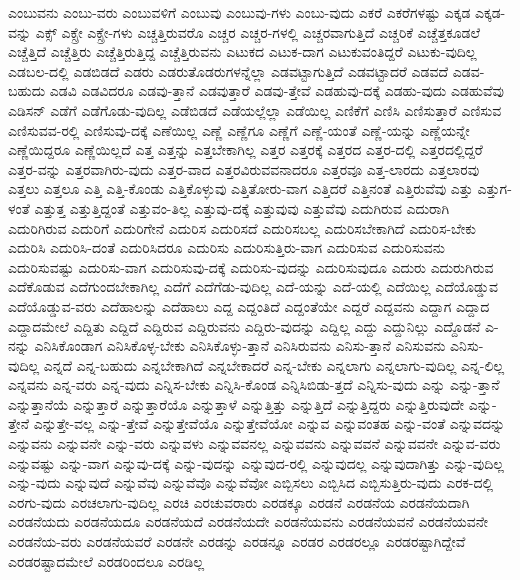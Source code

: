 {ಎಂಬುವನು
ಎಂಬು-ವರು
ಎಂಬುವಳಿಗೆ
ಎಂಬುವು
ಎಂಬುವು-ಗಳು
ಎಂಬು-ವುದು
ಎಕರೆ
ಎಕರೆಗಳಷ್ಟು
ಎಕ್ಕಡ
ಎಕ್ಕಡ-ವನ್ನು
ಎಕ್ಸ್
ಎಕ್ಸ್ರೇ
ಎಕ್ಸ್ರೇ-ಗಳು
ಎಚ್ಚತ್ತಿರುವರೊ
ಎಚ್ಚರ
ಎಚ್ಚರ-ಗಳಲ್ಲಿ
ಎಚ್ಚರವಾಗುತ್ತಿದೆ
ಎಚ್ಚರಿಕೆ
ಎಚ್ಚೆತ್ತಕೂಡಲೆ
ಎಚ್ಚೆತ್ತಿದೆ
ಎಚ್ಚೆತ್ತಿರು
ಎಚ್ಚೆತ್ತಿರುತ್ತಿದ್ದ
ಎಚ್ಚೆತ್ತಿರುವನು
ಎಟುಕದ
ಎಟುಕ-ದಾಗ
ಎಟುಕುವಂತಿದ್ದರೆ
ಎಟುಕು-ವುದಿಲ್ಲ
ಎಡಬಲ-ದಲ್ಲಿ
ಎಡಬಿಡದೆ
ಎಡರು
ಎಡರುತೊಡರುಗಳನ್ನೆಲ್ಲಾ
ಎಡವಟ್ಟಾಗುತ್ತಿದೆ
ಎಡವಟ್ಟಾದರೆ
ಎಡವದೆ
ಎಡವ-ಬಹುದು
ಎಡವಿ
ಎಡವಿದರೂ
ಎಡವು-ತ್ತಾನೆ
ಎಡವುತ್ತಾರೆ
ಎಡವು-ತ್ತೇವೆ
ಎಡಹುವು-ದಕ್ಕೆ
ಎಡಹು-ವುದು
ಎಡಹುವೆವು
ಎಡಿಸನ್
ಎಡೆಗೆ
ಎಡೆಗೊಡು-ವುದಿಲ್ಲ
ಎಡೆಬಿಡದೆ
ಎಡೆಯಲ್ಲೆಲ್ಲಾ
ಎಡೆಯಿಲ್ಲ
ಎಣಿಕೆಗೆ
ಎಣಿಸಿ
ಎಣಿಸುತ್ತಾರೆ
ಎಣಿಸುವ
ಎಣಿಸುವವ-ರಲ್ಲಿ
ಎಣಿಸುವು-ದಕ್ಕೆ
ಎಣೆಯಿಲ್ಲ
ಎಣ್ಣೆ
ಎಣ್ಣೆಗೂ
ಎಣ್ಣೆಗೆ
ಎಣ್ಣೆ-ಯಂತೆ
ಎಣ್ಣೆ-ಯನ್ನು
ಎಣ್ಣೆಯನ್ನೇ
ಎಣ್ಣೆಯಿದ್ದರೂ
ಎಣ್ಣೆಯಿಲ್ಲದೆ
ಎತ್ತ
ಎತ್ತನ್ನು
ಎತ್ತಬೇಕಾಗಿಲ್ಲ
ಎತ್ತರ
ಎತ್ತರಕ್ಕೆ
ಎತ್ತರದ
ಎತ್ತರ-ದಲ್ಲಿ
ಎತ್ತರದಲ್ಲಿದ್ದರೆ
ಎತ್ತರ-ವನ್ನು
ಎತ್ತರವಾಗಿರು-ವುದು
ಎತ್ತರ-ವಾದ
ಎತ್ತರವಿರುವವನಾದರೂ
ಎತ್ತರವೂ
ಎತ್ತ-ಲಾರದು
ಎತ್ತಲಾರವು
ಎತ್ತಲು
ಎತ್ತಲೂ
ಎತ್ತಿ
ಎತ್ತಿ-ಕೊಂಡು
ಎತ್ತಿಕೊಳ್ಳುವು
ಎತ್ತಿತೋರು-ವಾಗ
ಎತ್ತಿದರೆ
ಎತ್ತಿನಂತೆ
ಎತ್ತಿರುವೆವು
ಎತ್ತು
ಎತ್ತುಗ-ಳಂತೆ
ಎತ್ತುತ್ತ
ಎತ್ತುತ್ತಿದ್ದಂತೆ
ಎತ್ತುವಂ-ತಿಲ್ಲ
ಎತ್ತುವು-ದಕ್ಕೆ
ಎತ್ತುವುವು
ಎತ್ತುವೆವು
ಎದುಗಿರುವ
ಎದುರಾಗಿ
ಎದುರಿಗಿರುವ
ಎದುರಿಗೆ
ಎದುರಿಗೇನೆ
ಎದುರಿಸ
ಎದುರಿಸದೆ
ಎದುರಿಸಬಲ್ಲ
ಎದುರಿಸಬೇಕಾಗಿದೆ
ಎದುರಿಸ-ಬೇಕು
ಎದುರಿಸಿ
ಎದುರಿಸಿ-ದಂತೆ
ಎದುರಿಸಿದರೂ
ಎದುರಿಸು
ಎದುರಿಸುತ್ತಿರು-ವಾಗ
ಎದುರಿಸುವ
ಎದುರಿಸುವನು
ಎದುರಿಸುವಷ್ಟು
ಎದುರಿಸು-ವಾಗ
ಎದುರಿಸುವು-ದಕ್ಕೆ
ಎದುರಿಸು-ವುದನ್ನು
ಎದುರಿಸುವುದೂ
ಎದುರು
ಎದುರುಗಿರುವ
ಎದೆಕೊಡುವ
ಎದೆಗುಂದಬೇಕಾಗಿಲ್ಲ
ಎದೆಗೆ
ಎದೆಗೆಡು-ವುದಿಲ್ಲ
ಎದೆ-ಯನ್ನು
ಎದೆ-ಯಲ್ಲಿ
ಎದೆಯಿಲ್ಲ
ಎದೆಯೊಡ್ಡುವ
ಎದೆಯೊಡ್ಡುವ-ವರು
ಎದೆಹಾಲನ್ನು
ಎದೆಹಾಲು
ಎದ್ದ
ಎದ್ದಂತಿದೆ
ಎದ್ದಂತೆಯೇ
ಎದ್ದರೆ
ಎದ್ದವನು
ಎದ್ದಾಗ
ಎದ್ದಾದ
ಎದ್ದಾದಮೇಲೆ
ಎದ್ದಿತು
ಎದ್ದಿದೆ
ಎದ್ದಿರುವ
ಎದ್ದಿರುವನು
ಎದ್ದಿರು-ವುದನ್ನು
ಎದ್ದಿಲ್ಲ
ಎದ್ದು
ಎದ್ದುನಿಲ್ಲು
ಎದ್ದೊಡನೆ
ಎ-ನನ್ನು
ಎನಿಸಿಕೊಂಡಾಗ
ಎನಿಸಿಕೊಳ್ಳ-ಬೇಕು
ಎನಿಸಿಕೊಳ್ಳು-ತ್ತಾನೆ
ಎನಿಸಿರುವನು
ಎನಿಸು-ತ್ತಾನೆ
ಎನಿಸುವನು
ಎನಿಸು-ವುದಿಲ್ಲ
ಎನ್ನದೆ
ಎನ್ನ-ಬಹುದು
ಎನ್ನಬೇಕಾಗಿದೆ
ಎನ್ನಬೇಕಾದರೆ
ಎನ್ನ-ಬೇಕು
ಎನ್ನಲಾಗು
ಎನ್ನಲಾಗು-ವುದಿಲ್ಲ
ಎನ್ನ-ಲಿಲ್ಲ
ಎನ್ನವನು
ಎನ್ನ-ವರು
ಎನ್ನ-ವುದು
ಎನ್ನಿಸ-ಬೇಕು
ಎನ್ನಿಸಿ-ಕೊಂಡ
ಎನ್ನಿಸಿಬಿಡು-ತ್ತದೆ
ಎನ್ನಿಸು-ವುದು
ಎನ್ನು
ಎನ್ನು-ತ್ತಾನೆ
ಎನ್ನುತ್ತಾನೆಯೆ
ಎನ್ನುತ್ತಾರೆ
ಎನ್ನುತ್ತಾರೆಯೊ
ಎನ್ನುತ್ತಾಳೆ
ಎನ್ನುತ್ತಿತ್ತು
ಎನ್ನುತ್ತಿದೆ
ಎನ್ನುತ್ತಿದ್ದರು
ಎನ್ನುತ್ತಿರುವುದೇ
ಎನ್ನು-ತ್ತೇನೆ
ಎನ್ನುತ್ತೇ-ವಲ್ಲ
ಎನ್ನು-ತ್ತೇವೆ
ಎನ್ನುತ್ತೇವೆಯೊ
ಎನ್ನುತ್ತೇವೆಯೋ
ಎನ್ನುವ
ಎನ್ನುವಂತಹ
ಎನ್ನು-ವಂತೆ
ಎನ್ನುವದನ್ನು
ಎನ್ನುವನು
ಎನ್ನುವನೇ
ಎನ್ನು-ವರು
ಎನ್ನುವಳು
ಎನ್ನುವವನಲ್ಲ
ಎನ್ನುವವನು
ಎನ್ನುವವನೆ
ಎನ್ನುವವನೇ
ಎನ್ನುವ-ವರು
ಎನ್ನುವಷ್ಟು
ಎನ್ನು-ವಾಗ
ಎನ್ನುವು-ದಕ್ಕೆ
ಎನ್ನು-ವುದನ್ನು
ಎನ್ನುವುದ-ರಲ್ಲಿ
ಎನ್ನುವುದಲ್ಲ
ಎನ್ನುವುದಾಗಿತ್ತು
ಎನ್ನು-ವುದಿಲ್ಲ
ಎನ್ನು-ವುದು
ಎನ್ನುವುದೆ
ಎನ್ನುವೆವು
ಎನ್ನುವೆವೊ
ಎನ್ನುವೆವೋ
ಎಬ್ಬಿಸಲು
ಎಬ್ಬಿಸಿದ
ಎಬ್ಬಿಸುತ್ತಿರು-ವುದು
ಎರಕ-ದಲ್ಲಿ
ಎರಗು-ವುದು
ಎರಚಲಾಗು-ವುದಿಲ್ಲ
ಎರಚಿ
ಎರಚುವರಾರು
ಎರಡಕ್ಕೂ
ಎರಡನೆ
ಎರಡನೆಯ
ಎರಡನೆಯದಾಗಿ
ಎರಡನೆಯದು
ಎರಡನೆಯದೂ
ಎರಡನೆಯದೆ
ಎರಡನೆಯದೇ
ಎರಡನೆಯವನು
ಎರಡನೆಯವನೆ
ಎರಡನೆಯವನೇ
ಎರಡನೆಯ-ವರು
ಎರಡನೆಯವರೆ
ಎರಡನೇ
ಎರಡನ್ನು
ಎರಡನ್ನೂ
ಎರಡರ
ಎರಡರಲ್ಲೂ
ಎರಡರಷ್ಟಾಗಿದ್ದೇವೆ
ಎರಡರಷ್ಟಾದಮೇಲೆ
ಎರಡರಿಂದಲೂ
ಎರಡಿಲ್ಲ
}
